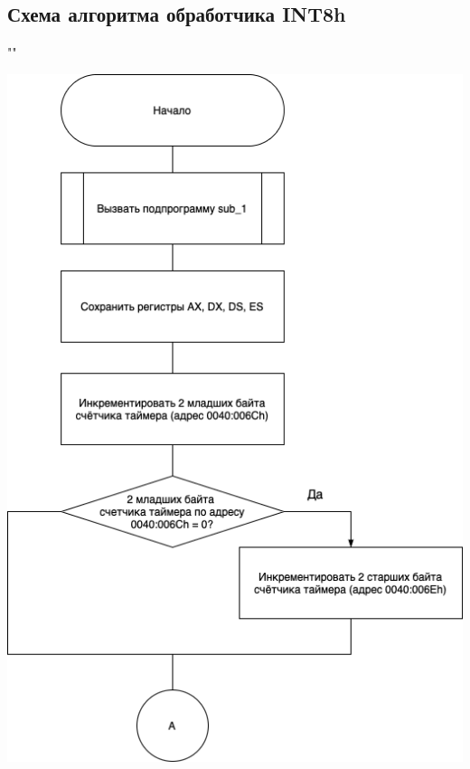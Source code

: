 \documentclass[a4paper,14pt]{article}
\begin{document}
\subsection{Схема алгоритма обработчика INT8h}
""\newline

\begin{flushright}
	\includegraphics[scale=0.75]{int8h_1.png}

\end{flushright}
\end{document}
